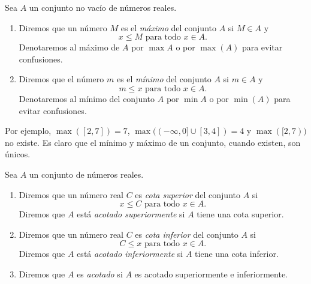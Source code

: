 \documentclass[12pt,a4paper]{book}
\begin{document}
    \begin{definicion}\label{def:13}
        Sea $A$ un conjunto no vacío de números reales.
        \begin{enumerate}
            \item Diremos que un número $M$ es el \textit{máximo} del conjunto $A$ si $M\in A$ y
            \begin{equation*}
                x\leq M\text{ para todo }x\in A.
            \end{equation*}
            Denotaremos al máximo de $A$ por $\max A$ o por $\max(A)$ para evitar confusiones.
            \item Diremos que el número $m$ es el \textit{mínimo} del conjunto $A$ si $m\in A$ y
            \begin{equation*}
                m\leq x\text{ para todo }x\in A.
            \end{equation*}
            Denotaremos al mínimo del conjunto $A$ por $\min A$ o por $\min(A)$ para
            evitar confusiones.
        \end{enumerate}
    \end{definicion}

    Por ejemplo, $\max([2,7])=7$, $\max((-\infty,0]\cup[3,4])=4$ y $\max([2,7))$ no
    existe. Es claro que el mínimo y máximo de un conjunto, cuando existen, son
    únicos.

    \begin{definicion}\label{def:14}
        Sea $A$ un conjunto de números reales.
        \begin{enumerate}
            \item Diremos que un número real $C$ es \textit{cota superior} del conjunto $A$ si
            \begin{equation*}
                x\leq C\text{ para todo }x\in A.
            \end{equation*}
            Diremos que $A$ está \textit{acotado superiormente} si $A$ tiene una cota superior.
            \item Diremos que un número real $C$ es \textit{cota inferior} del conjunto $A$ si
            \begin{equation*}
                C\leq x\text{ para todo }x\in A.
            \end{equation*}
            Diremos que $A$ está \textit{acotado inferiormente} si $A$ tiene una cota inferior.
            \item Diremos que $A$ es \textit{acotado} si $A$ es acotado superiormente e inferiormente.
        \end{enumerate}
    \end{definicion}
\end{document}
